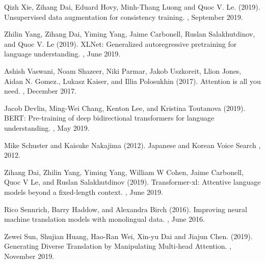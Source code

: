 \documentclass[twoside,twocolumn,10pt]{article}
\begin{document}
\begin{thebibliography}{99} %

Qizh Xie, Zihang Dai, Eduard Hovy, Minh-Thang Luong and Quoc V. Le. (2019).
\newblock Unsupervised data augmentation for consistency training.
, September 2019.

Zhilin Yang, Zihang Dai, Yiming Yang, Jaime Carbonell, Ruslan Salakhutdinov, and Quoc V. Le (2019).
\newblock XLNet: Generalized autoregressive pretraining for language understanding.
, June 2019.

Ashish Vaswani, Noam Shazeer, Niki Parmar, Jakob Uszkoreit, Llion Jones, Aidan N. Gomez., Lukasz Kaiser, and Illia Polosukhin (2017).
\newblock Attention is all you need.
, December 2017.

Jacob Devlin, Ming-Wei Chang, Kenton Lee, and Kristina Toutanova (2019).
\newblock BERT: Pre-training of deep bidirectional transformers for language understanding.
, May 2019.

Mike Schuster and Kaisuke Nakajima (2012).
\newblock Japanese and Korean Voice Search
 , 2012.
 
Zihang Dai, Zhilin Yang, Yiming Yang, William W Cohen, Jaime Carbonell, Quoc V Le,
and Ruslan Salakhutdinov (2019).
\newblock Transformer-xl: Attentive language models beyond a fixed-length
 context. 
, June 2019.

Rico Sennrich, Barry Haddow, and Alexandra Birch (2016). 
\newblock Improving neural machine translation models with monolingual data. 
, June 2016.

Zewei Sun, Shujian Huang, Hao-Ran Wei, Xin-yu Dai and Jiajun Chen. (2019).
\newblock Generating Diverse Translation by Manipulating Multi-head Attention.
, November 2019.
 
\end{thebibliography}

\end{document}
